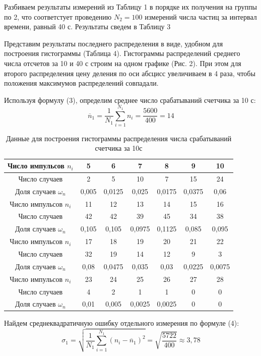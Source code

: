 \documentclass[a4paper,12pt]{article} %
\begin{document}
Разбиваем результаты измерений из Таблицу 1 в порядке их получения на группы по 2, что соответстует проведению $N_2 = 100$ измерений числа частиц за интервал времени, равный 40 с. Результаты сведем в Таблицу 3

Представим результаты последнего распределения в виде, удобном для построения гистограммы (Таблица 4). Гистограммы распределений среднего числа отсчетов за 10 и 40 с строим на одном графике (Рис. 2). При этом для второго распределения цену деления по оси абсцисс увеличиваем в 4 раза, чтобы положения максимумов распределений совпадали.

Используя формулу (3), определим среднее число срабатываний счетчика за 10 с:
\[\overline{n}_1 = \frac{1}{N_1}\sum_{i=1}^{N_1}n_i = \frac{5600}{400}=14\]
\newpage
\begin{table}[h]
\centering
\caption{Данные для построения гистограммы распределения числа срабатываний счетчика за 10с}
\label{table 2}
\begin{tabular}{|c|c|c|c|c|c|c|}
\hline
Число импульсов $n_i$ & 5 & 6 & 7 & 8 & 9 & 10 \\ \hline
Число случаев   &  2 & 5  & 10  & 7  & 15  & 24  \\ \hline
Доля случаев $\omega_n$   & 0,005  & 0,0125  & 0,025  & 0,0175  & 0,0375  & 0,06  \\ \hline\hline
Число импульсов $n_i$ & 11& 12 & 13 & 14 &15 & 16 \\ \hline
Число случаев   & 42 & 42  &39   & 45  & 34  & 38  \\ \hline
Доля случаев $\omega_n$   & 0,105  & 0,105  & 0,0975  & 0,1125  & 0,085  &0,095   \\ \hline\hline
Число импульсов $n_i$ & 17 & 18 & 19 & 20 &21 & 22 \\ \hline
Число случаев   &  32 & 19  & 14  & 12  & 9  & 3  \\ \hline
Доля случаев $\omega_n$   & 0,08  & 0,0475  & 0,035  & 0,03  & 0,0225  & 0,0075  \\ \hline
Число импульсов $n_i$ &23 & 24 & 25 & 26 &27 & 28 \\ \hline
Число случаев   &  4 & 2  &1   & 1  & 0  &0   \\ \hline
Доля случаев $\omega_n$   & 0,01  & 0,005  & 0,0025  & 0,0025  & 0  & 0  \\ \hline
\end{tabular}
\end{table}

Найдем среднеквадратичную ошибку отдельного измерения по формуле (4):
\[\sigma_1 = \sqrt{\frac{1}{N_1}\sum_{i=1}^{N_1}(n_i-\overline{n}_1)^2}=\sqrt{\frac{5722}{400}} \approx 3,78\]
\end{document}
